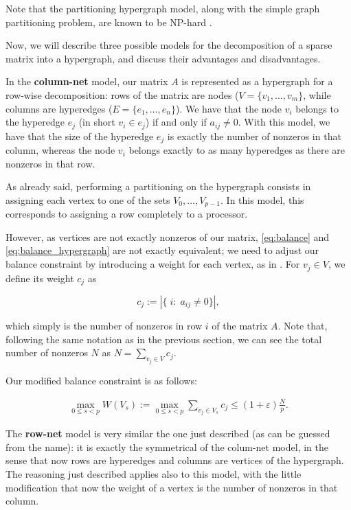 Note that the partitioning hypergraph model, along with the simple graph partitioning problem, are known to be NP-hard \cite[Ch.~6]{lengauer}. 

Now, we will describe three possible models for the decomposition of a sparse matrix into a hypergraph, and discuss their advantages and disadvantages.

In the \textbf{column-net} model, our matrix $A$ is represented as a hypergraph for a row-wise decomposition: rows of the matrix are nodes ($V=\{v_1,\dots,v_m\}$, while columns are hyperedges ($E= \{e_1,\dots,e_n\}$). We have that the node $v_i$ belongs to the hyperedge $e_j$ (in short $v_i \in e_j$) if and only if $a_{ij} \neq 0$. With this model, we have that the size of the hyperedge $e_j$ is exactly the number of nonzeros in that column, whereas the node $v_i$ belongs exactly to as many hyperedges as there are nonzeros in that row.

As already said, performing a partitioning on the hypergraph consists in assigning each vertex to one of the sets $V_0,\dots,V_{p-1}$. In this model, this corresponds to assigning a row completely to a processor.

However, as vertices are not exactly nonzeros of our matrix, \eqref{eq:balance} and \eqref{eq:balance_hypergraph} are not exactly equivalent; we need to adjust our balance constraint by introducing a weight for each vertex, as in \cite[Def.~4.34]{BSP}. For $v_j \in V$, we define its weight $c_j$ as

\[
	c_j := |\{\;i : \;a_{ij} \neq 0\}|,
\]

which simply is the number of nonzeros in row $i$ of the matrix $A$. Note that, following the same notation as in the previous section, we can see the total number of nonzeros $N$ as $N = \sum_{v_j \in V} c_j$.

Our modified balance constraint is as follows:

\begin{align}
	\max_{0 \leq s <p}	W(V_s) := \max_{0 \leq s <p} \sum_{v_j \in V_s} c_j \leq (1 + \varepsilon) \frac{N}{p}.
	\label{eq:balance_columnet}
\end{align}

The \textbf{row-net} model is very similar the one just described (as can be guessed from the name): it is exactly the symmetrical of the colum-net model, in the sense that now rows are hyperedges and columns are vertices of the hypergraph. The reasoning just described applies also to this model, with the little modification that now the weight of a vertex is the number of nonzeros in that column.

